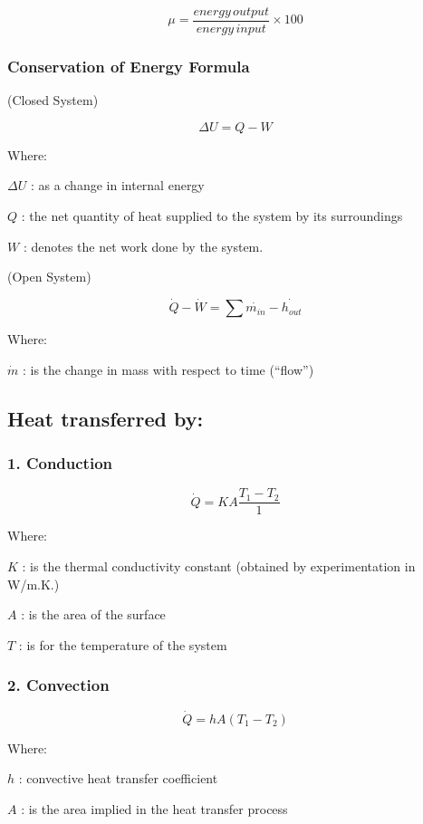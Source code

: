 \documentclass[]{book}
\theoremstyle{definition}
\theoremstyle{definition}
\theoremstyle{definition}
\theoremstyle{remark}
\begin{document}
\[\mu = \frac{energy \, output}{energy \, input} \times 100 \]

\subsubsection{Conservation of Energy
Formula}\label{conservation-of-energy-formula}

(Closed System)

\[\Delta U = Q - W \]

Where:

\(\Delta U\) : as a change in internal energy

\(Q\) : the net quantity of heat supplied to the system by its
surroundings

\(W\) : denotes the net work done by the system.

(Open System)

\[ \dot{Q} -\dot{W} = \sum \dot{m_{in}}  - \dot{h_{out}}\]

Where:

\(\dot{m}\) : is the change in mass with respect to time (``flow'')

\subsection{Heat transferred by:}\label{heat-transferred-by}

\subsubsection{1. Conduction}\label{conduction}

\[ \dot{Q}= KA \frac{T_{1}-T_{2}}{1} \]

Where:

\(K\) : is the thermal conductivity constant (obtained by
experimentation in W/m.K.)

\(A\) : is the area of the surface

\(T\) : is for the temperature of the system

\subsubsection{2. Convection}\label{convection}

\[\dot{Q}= hA ({T_{1}-T_{2}}) \]

Where:

\(h\) : convective heat transfer coefficient

\(A\) : is the area implied in the heat transfer process
\end{document}
